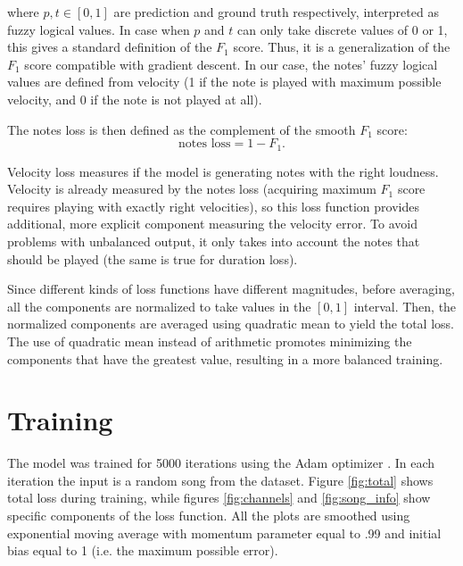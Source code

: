 \documentclass[en]{pracamgr}
\begin{document}
where $p,t\in[0,1]$ are prediction and ground truth respectively, interpreted as fuzzy logical values.
In case when $p$ and $t$ can only take discrete values of 0 or 1, this gives a standard definition of the $F_1$ score.
Thus, it is a generalization of the $F_1$ score compatible with gradient descent.
In our case, the notes' fuzzy logical values are defined from velocity (1 if the note is played with maximum possible velocity, and 0 if the note is not played at all).

The notes loss is then defined as the complement of the smooth $F_1$ score:
\begin{equation}
    \textrm{notes loss} = 1 - F_1.
\end{equation}

Velocity loss measures if the model is generating notes with the right loudness.
Velocity is already measured by the notes loss (acquiring maximum $F_1$ score requires playing with exactly right velocities), so this loss function provides additional, more explicit component measuring the velocity error.
To avoid problems with unbalanced output, it only takes into account the notes that should be played (the same is true for duration loss).

Since different kinds of loss functions have different magnitudes, before averaging, all the components are normalized to take values in the $[0,1]$ interval.
Then, the normalized components are averaged using quadratic mean to yield the total loss. The use of quadratic mean instead of arithmetic promotes minimizing the components that have the greatest value, resulting in a more balanced training.

\section{Training}

The model was trained for 5000 iterations using the Adam optimizer \cite{adam}.
In each iteration the input is a random song from the dataset.
Figure \ref{fig:total} shows total loss during training, while figures \ref{fig:channels} and \ref{fig:song_info} show specific components of the loss function.
All the plots are smoothed using exponential moving average with momentum parameter equal to .99 and initial bias equal to 1 (i.e. the maximum possible error).
\end{document}
